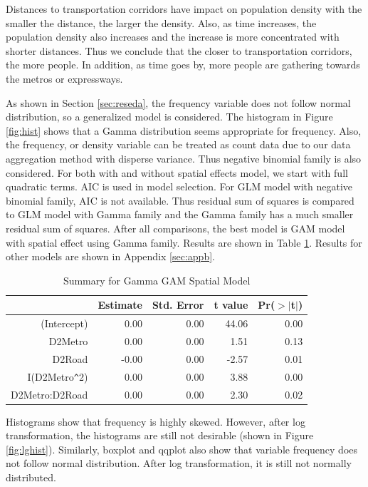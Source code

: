 \documentclass[hidelinks,12pt]{article}
\begin{document}
	Distances to transportation corridors have impact on population density with the smaller the distance, the larger the density. Also, as time increases, the population density also increases and the increase is more concentrated with shorter distances. Thus we conclude that the closer to transportation corridors, the more people. In addition, as time goes by, more people are gathering towards the metros or expressways.
	
	As shown in Section \ref{sec:reseda}, the frequency variable does not follow normal distribution, so a generalized model is considered. The histogram in Figure \ref{fig:hist} shows that a Gamma distribution seems appropriate for frequency. Also, the frequency, or density variable can be treated as count data due to our data aggregation method with disperse variance. Thus negative binomial family is also considered. For both with and without spatial effects model, we start with full quadratic terms. AIC is used in model selection. For GLM model with negative binomial family, AIC is not available. Thus residual sum of squares is compared to GLM model with Gamma family and the Gamma family has a much smaller residual sum of squares. After all comparisons, the best model is GAM model with spatial effect using Gamma family. Results are shown in Table \ref{tbl:bestx}. Results for other models are shown in Appendix \ref{sec:appb}.	
	\begin{table}[ht]
		\centering
		\caption{Summary for Gamma GAM Spatial Model \label{tbl:bestx}}
		\begin{tabular}{rrrrr}
			\hline
			& Estimate & Std. Error & t value & Pr($>$$|$t$|$) \\ 
			\hline
			(Intercept) & 0.00 & 0.00 & 44.06 & 0.00 \\ 
			D2Metro & 0.00 & 0.00 & 1.51 & 0.13 \\ 
			D2Road & -0.00 & 0.00 & -2.57 & 0.01 \\ 
			I(D2Metro\verb|^|2) & 0.00 & 0.00 & 3.88 & 0.00 \\ 
			D2Metro:D2Road & 0.00 & 0.00 & 2.30 & 0.02 \\ 
			\hline
		\end{tabular}
	\end{table}

	Histograms show that frequency is highly skewed. However, after log transformation, the histograms are still not desirable (shown in Figure \ref{fig:lghist}). Similarly, boxplot and qqplot also show that variable frequency does not follow normal distribution. After log transformation, it is still not normally distributed.
\end{document}
